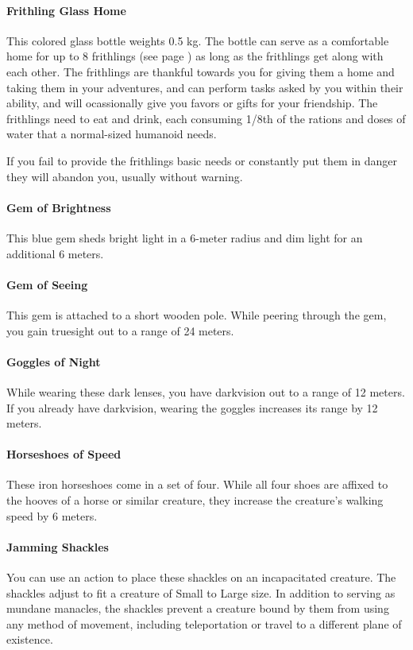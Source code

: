     \paragraph{Frithling Glass Home}
        This colored glass bottle weights 0.5 kg.
        The bottle can serve as a comfortable home for up to 8 frithlings (see page \pageref{creature::frithling}) as long as the frithlings get along with each other.
        The frithlings are thankful towards you for giving them a home and taking them in your adventures, and can perform tasks asked by you within their ability, and will ocassionally give you favors or gifts for your friendship.
        The frithlings need to eat and drink, each consuming 1/8th of the rations and doses of water that a normal-sized humanoid needs.

        If you fail to provide the frithlings basic needs or constantly put them in danger they will abandon you, usually without warning.
    \paragraph{Gem of Brightness}
        This blue gem sheds bright light in a 6-meter radius and dim light for an additional 6 meters.
    \paragraph{Gem of Seeing}
        This gem is attached to a short wooden pole.
        While peering through the gem, you gain truesight out to a range of 24 meters.
    \paragraph{Goggles of Night}
        While wearing these dark lenses, you have darkvision out to a range of 12 meters.
        If you already have darkvision, wearing the goggles increases its range by 12 meters.
    \paragraph{Horseshoes of Speed}
        These iron horseshoes come in a set of four.
        While all four shoes are affixed to the hooves of a horse or similar creature, they increase the creature's walking speed by 6 meters.
    \paragraph{Jamming Shackles}
        You can use an action to place these shackles on an incapacitated creature.
        The shackles adjust to fit a creature of Small to Large size.
        In addition to serving as mundane manacles, the shackles prevent a creature bound by them from using any method of movement, including teleportation or travel to a different plane of existence.

